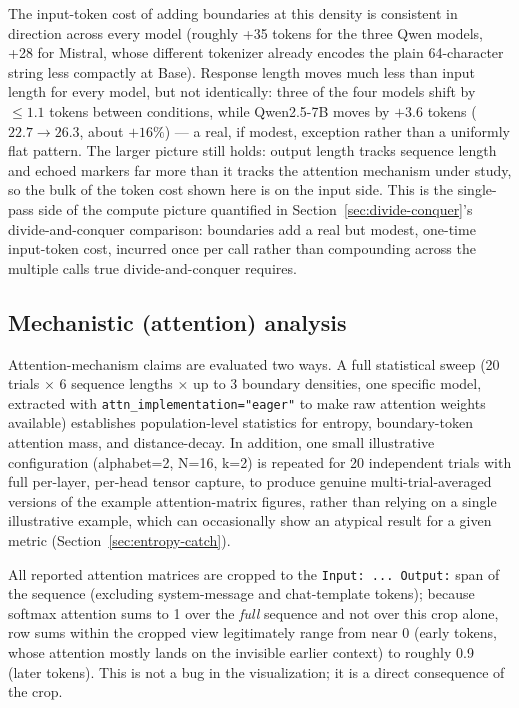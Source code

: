 \documentclass[11pt]{article}
\begin{document}
The input-token cost of adding boundaries at this density is consistent in direction across every model (roughly +35 tokens for the three Qwen models, +28 for Mistral, whose different tokenizer already encodes the plain 64-character string less compactly at Base). Response length moves much less than input length for every model, but not identically: three of the four models shift by $\leq1.1$ tokens between conditions, while Qwen2.5-7B moves by $+3.6$ tokens ($22.7 \to 26.3$, about $+16\%$) --- a real, if modest, exception rather than a uniformly flat pattern. The larger picture still holds: output length tracks sequence length and echoed markers far more than it tracks the attention mechanism under study, so the bulk of the token cost shown here is on the input side. This is the single-pass side of the compute picture quantified in Section~\ref{sec:divide-conquer}'s divide-and-conquer comparison: boundaries add a real but modest, one-time input-token cost, incurred once per call rather than compounding across the multiple calls true divide-and-conquer requires.

\subsection{Mechanistic (attention) analysis}
\label{sec:mechanistic-methods}

Attention-mechanism claims are evaluated two ways. A full statistical sweep (20 trials $\times$ 6 sequence lengths $\times$ up to 3 boundary densities, one specific model, extracted with \texttt{attn\_implementation="eager"} to make raw attention weights available) establishes population-level statistics for entropy, boundary-token attention mass, and distance-decay. In addition, one small illustrative configuration (alphabet=2, N=16, k=2) is repeated for 20 independent trials with full per-layer, per-head tensor capture, to produce genuine multi-trial-averaged versions of the example attention-matrix figures, rather than relying on a single illustrative example, which can occasionally show an atypical result for a given metric (Section~\ref{sec:entropy-catch}).

All reported attention matrices are cropped to the \texttt{Input: ... Output:} span of the sequence (excluding system-message and chat-template tokens); because softmax attention sums to 1 over the \emph{full} sequence and not over this crop alone, row sums within the cropped view legitimately range from near 0 (early tokens, whose attention mostly lands on the invisible earlier context) to roughly 0.9 (later tokens). This is not a bug in the visualization; it is a direct consequence of the crop.
\end{document}
